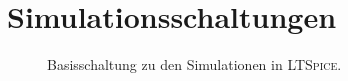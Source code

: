 \chapter{Simulationsschaltungen}
\begin{figure}[h]
	\centering
	
	\caption[Basisschaltung zu den Simulationen in \textsc{LTSpice}.]{Basisschaltung zu den Simulationen in \textsc{LTSpice}.}
	\label{fig:minimum load simu schaltung}
\end{figure}